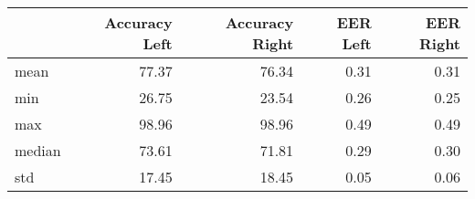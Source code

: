 \begin{tabular}{lrrrr}
\toprule
{} &  Accuracy Left &  Accuracy Right &  EER Left &  EER Right \\
\midrule
mean   &          77.37 &           76.34 &      0.31 &       0.31 \\
min    &          26.75 &           23.54 &      0.26 &       0.25 \\
max    &          98.96 &           98.96 &      0.49 &       0.49 \\
median &          73.61 &           71.81 &      0.29 &       0.30 \\
std    &          17.45 &           18.45 &      0.05 &       0.06 \\
\bottomrule
\end{tabular}

